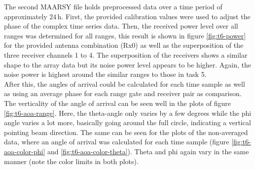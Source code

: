 The second MAARSY file holds preprocessed data over a time period of approximately $24\,\si{\hour}$. First, the provided calibration values were used to adjust the phase of the complex time series data. Then, the received power level over all ranges was determined for all ranges, this result is shown in figure \ref{fig:t6-power} for the provided antenna combination (Rx0) as well as the superposition of the three receiver channels 1 to 4. The superposition of the receivers shows a similar shape to the array data but its noise power level appears to be higher. Again, the noise power is highest around the similar ranges to those in task 5.\\

After this, the angles of arrival could be calculated for each time sample as well as using an average phase for each range gate and receiver pair as comparison.\\

The verticality of the angle of arrival can be seen well in the plots of figure \ref{fig:t6-aoa-range}. Here, the theta-angle only varies by a few degrees while the phi angle varies a lot more, basically going around the full circle, indicating a vertical pointing beam direction. The same can be seen for the plots of the non-averaged data, where an angle of arrival was calculated for each time sample (figure \ref{fig:t6-aoa-color-phi} and \ref{fig:t6-aoa-color-theta}). Theta and phi again vary in the same manner (note the color limits in both plots).\\


